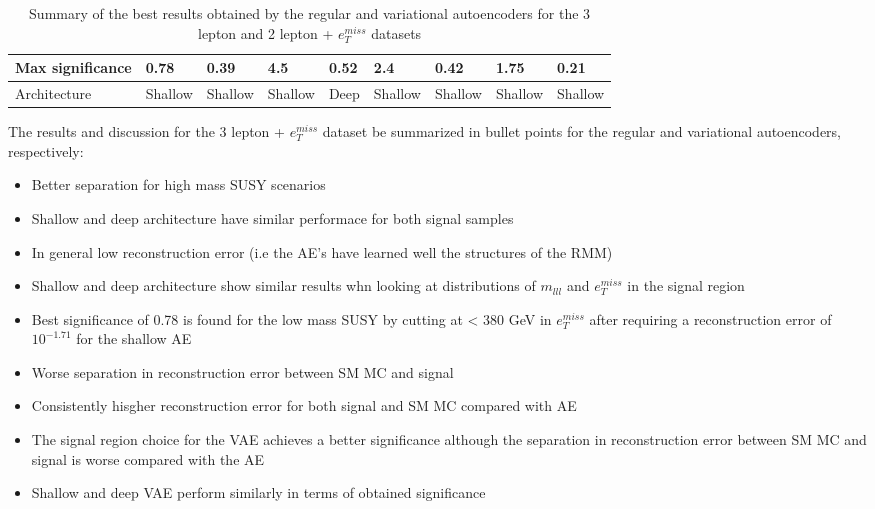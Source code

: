 \begin{table}[h!]
\begin{tabular}{l|llll|llll|}
    \multicolumn{1}{|l|}{Max significance}                                                       & \multicolumn{1}{l|}{0.78}            & \multicolumn{1}{l|}{0.39}            & \multicolumn{1}{l|}{4.5}             &        \multicolumn{1}{l|}{0.52}              & \multicolumn{1}{l|}{2.4}            & \multicolumn{1}{l|}{0.42}            & \multicolumn{1}{l|}{1.75}             &    \multicolumn{1}{l|}{0.21}             \\ \hline
    \multicolumn{1}{|l|}{Architecture}                                                           & \multicolumn{1}{l|}{Shallow}            & \multicolumn{1}{l|}{Shallow}            & \multicolumn{1}{l|}{Shallow}             &        \multicolumn{1}{l|}{Deep}     & \multicolumn{1}{l|}{Shallow}     & \multicolumn{1}{l|}{Shallow}            & \multicolumn{1}{l|}{Shallow}             &    \multicolumn{1}{l|}{Shallow}             \\ \hline
    \end{tabular}
    \caption[Executive summary table]{Summary of the best results obtained by the regular and variational autoencoders for the 3 lepton and 2 lepton + $e_T^{miss}$ datasets}
    \label{tab:exec_summary}
\end{table}


The results and discussion for the 3 lepton + $e_T^{miss}$ dataset be summarized in bullet points for the regular and variational autoencoders, respectively:
\begin{itemize}
    \item Better separation for high mass SUSY scenarios 
    \item Shallow and deep architecture have similar performace for both signal samples 
    \item In general low reconstruction error (i.e the AE's have learned well the structures of the RMM)
    \item Shallow and deep architecture show similar results whn looking at distributions of $m_{lll}$ and $e_T^{miss}$ in the signal region 
    \item Best significance of 0.78 is found for the low mass SUSY by cutting at < 380 GeV in $e_T^{miss}$ after requiring a reconstruction error of $10^{-1.71}$ for the shallow AE
\end{itemize}

\begin{itemize}
    \item Worse separation in reconstruction error between SM MC and signal
    \item Consistently hisgher reconstruction error for both signal and SM MC compared with AE 
    \item The signal region choice for the VAE achieves a better significance although the separation in reconstruction error between SM MC and signal is worse compared with the AE
    \item Shallow and deep VAE perform similarly in terms of obtained significance
\end{itemize}